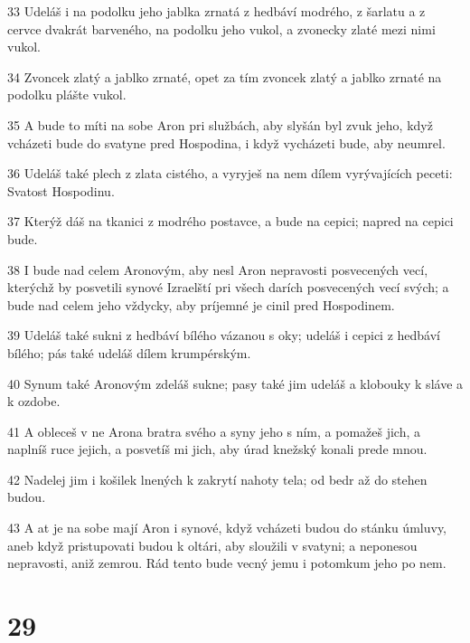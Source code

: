 \par 33 Udeláš i na podolku jeho jablka zrnatá z hedbáví modrého, z šarlatu a z cervce dvakrát barveného, na podolku jeho vukol, a zvonecky zlaté mezi nimi vukol.
\par 34 Zvoncek zlatý a jablko zrnaté, opet za tím zvoncek zlatý a jablko zrnaté na podolku plášte vukol.
\par 35 A bude to míti na sobe Aron pri službách, aby slyšán byl zvuk jeho, když vcházeti bude do svatyne pred Hospodina, i když vycházeti bude, aby neumrel.
\par 36 Udeláš také plech z zlata cistého, a vyryješ na nem dílem vyrývajících peceti: Svatost Hospodinu.
\par 37 Kterýž dáš na tkanici z modrého postavce, a bude na cepici; napred na cepici bude.
\par 38 I bude nad celem Aronovým, aby nesl Aron nepravosti posvecených vecí, kterýchž by posvetili synové Izraelští pri všech darích posvecených vecí svých; a bude nad celem jeho vždycky, aby príjemné je cinil pred Hospodinem.
\par 39 Udeláš také sukni z hedbáví bílého vázanou s oky; udeláš i cepici z hedbáví bílého; pás také udeláš dílem krumpérským.
\par 40 Synum také Aronovým zdeláš sukne; pasy také jim udeláš a klobouky k sláve a k ozdobe.
\par 41 A obleceš v ne Arona bratra svého a syny jeho s ním, a pomažeš jich, a naplníš ruce jejich, a posvetíš mi jich, aby úrad knežský konali prede mnou.
\par 42 Nadelej jim i košilek lnených k zakrytí nahoty tela; od bedr až do stehen budou.
\par 43 A at je na sobe mají Aron i synové, když vcházeti budou do stánku úmluvy, aneb když pristupovati budou k oltári, aby sloužili v svatyni; a neponesou nepravosti, aniž zemrou. Rád tento bude vecný jemu i potomkum jeho po nem.

\chapter{29}

